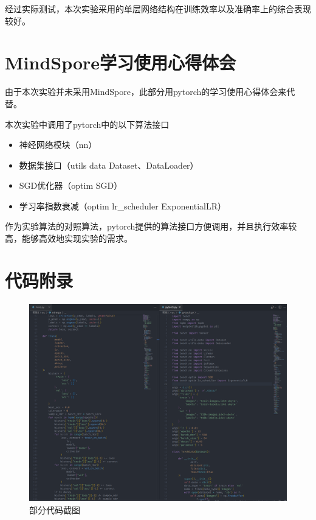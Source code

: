 \documentclass[notitlepage]{article}
\begin{document}
经过实际测试，本次实验采用的单层网络结构在训练效率以及准确率上的综合表现较好。

\section{MindSpore学习使用心得体会}

由于本次实验并未采用MindSpore，此部分用pytorch的学习使用心得体会来代替。

本次实验中调用了pytorch中的以下算法接口
\begin{itemize}
    \item 神经网络模块（nn）
    \item 数据集接口（utils data Dataset、DataLoader）
    \item SGD优化器（optim SGD）
    \item 学习率指数衰减（optim lr\_scheduler ExponentialLR）
\end{itemize}

作为实验算法的对照算法，pytorch提供的算法接口方便调用，并且执行效率较高，能够高效地实现实验的需求。

\newpage

\section{代码附录}

\begin{figure}[h]
    \centering
    \includegraphics*[width=\columnwidth]{../imgs/code.png}
    \caption{部分代码截图}
\end{figure}
\end{document}
